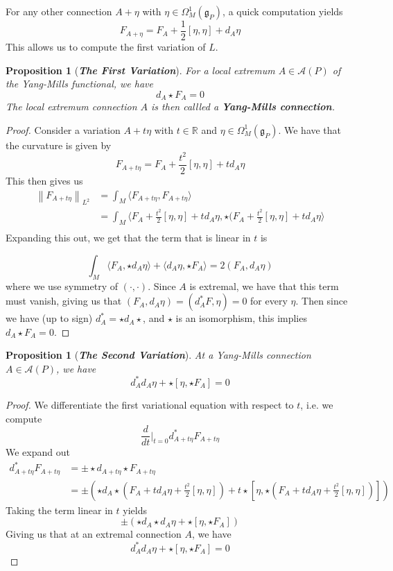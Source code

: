 \documentclass[psamsfonts, 12pt]{amsart}
\newtheorem{prop}[thm]{Proposition}
\theoremstyle{definition}
\theoremstyle{remark}
\newcommand{\R}{\mathbb{R}}
\newcommand{\ib}[1]{\textbf{\textit{#1}}}
\newcommand{\g}{\mathfrak{g}}
\newcommand{\norm}[1]{\left\lVert#1\right\rVert}
\begin{document}
For any other connection $A + \eta$ with $\eta \in \Omega^1_M(\g_P)$, a quick computation
yields
\[
F_{A+\eta} = F_A + \frac{1}{2}[\eta,\eta] + d_A\eta
\]
This allows us to compute the first variation of $L$.
%
\begin{prop}[\ib{The First Variation}]
For a local extremum $A \in \mathscr{A}(P)$ of the Yang-Mills functional, we have
\[
d_A\star F_A = 0
\]
The local extremum connection $A$ is then callled a \ib{Yang-Mills connection}.
\end{prop}
%
\begin{proof}
Consider a variation $A + t\eta$ with $t \in \R$ and $\eta \in \Omega^1_M(\g_P)$.
We have that the curvature is given by
\[
F_{A+t\eta} = F_A + \frac{t^2}{2}[\eta,\eta] + td_A\eta
\]
This then gives us
\begin{align*}
\norm{F_{A+t\eta}}_{L^2} &= \int_M \langle F_{A+t\eta},F_{A+t\eta}\rangle \\
&= \int_M \langle F_A + \frac{t^2}{2}[\eta,\eta]
+ td_A\eta,\star (F_A + \frac{t^2}{2}[\eta,\eta] + td_A\eta \rangle \\
\end{align*}
Expanding this out, we get that the term that is linear in $t$ is

\[
\int_M \langle F_A, \star d_A\eta\rangle + \langle d_A\eta, \star F_A \rangle
= 2(F_A,d_A\eta)
\]
where we use symmetry of $(\cdot,\cdot)$. Since $A$ is extremal, we have that
this term must vanish, giving us that $(F_A,d_A\eta) = (d^*_A F,\eta) = 0$ for
every $\eta$. Then since we have (up to sign) $d^*_A = \star d_A \star$, and
$\star$ is an isomorphism, this implies $d_A\star F_A = 0$.
\end{proof}
%
\begin{prop}[\ib{The Second Variation}]
At a Yang-Mills connection $A \in \mathscr{A}(P)$, we have
\[
d^*_A d_A\eta + \star[\eta,\star F_A] = 0
\]
\end{prop}
%
\begin{proof}
We differentiate the first variational equation with respect to $t$, i.e.
we compute
\[
\frac{d}{dt}\bigg\vert_{t=0} d_{A+t\eta}^*F_{A+t\eta}
\]
We expand out
\begin{align*}
d_{A+t\eta}^*F_{A+t\eta} &= \pm \star d_{A+t\eta}\star F_{A+t\eta} \\
&= \pm\left(\star d_A\star\left(F_A + td_A\eta + \frac{t^2}{2}[\eta,\eta]\right)
+ t\star
\left[\eta, \star\left(F_A + td_A\eta + \frac{t^2}{2}[\eta,\eta]\right)\right]\right)
\end{align*}
Taking the term linear in $t$ yields
\[
\pm\left( \star d_A\star d_A\eta + \star[\eta,\star F_A] \right)
\]
Giving us that at an extremal connection $A$, we have
\[
d^*_A d_A\eta + \star[\eta,\star F_A] = 0
\]
\end{proof}
%
%
\end{document}
